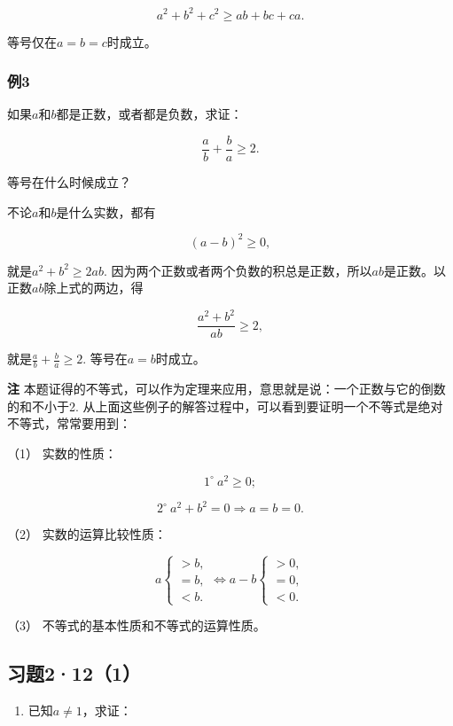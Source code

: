 \[
a^2+b^2+c^2\geqslant ab+bc+ca.
\]

等号仅在\(a=b=c\)时成立。

\subsubsection{例3}

如果\(a\)和\(b\)都是正数，或者都是负数，求证：

\[
\frac{a}{b} + \frac{b}{a} \geqslant 2.
\]

等号在什么时候成立？

 不论\(a\)和\(b\)是什么实数，都有

\[
(a - b)^{2} \geqslant 0,
\]

就是\(a^2 + b^2 \geqslant 2ab.\)
因为两个正数或者两个负数的积总是正数，所以\(ab\)是正数。以正数\(ab\)除上式的两边，得

\[
\frac{a^2+b^2}{ab} \geqslant 2,
\]

就是\(\frac{a}{b} +\frac{b}{a}\geqslant 2.\) 等号在\(a = b\)时成立。

\textbf{注}
本题证得的不等式，可以作为定理来应用，意思就是说：一个正数与它的倒数的和不小于2.
从上面这些例子的解答过程中，可以看到要证明一个不等式是绝对不等式，常常要用到：

（1） 实数的性质：

\[
1^{\circ}\ a^2\geqslant0;
\]

\[
2^{\circ}\ a^2+b^2=0 \Rightarrow a = b = 0.
\]

（2） 实数的运算比较性质：

\[
a \left\{ \begin{array}{ll} > b, \\ = b, \\ < b. \end{array} \right. \Leftrightarrow a - b \left\{ \begin{array}{ll} > 0, \\ = 0, \\ < 0. \end{array} \right.
\]

（3） 不等式的基本性质和不等式的运算性质。

\subsection{习题2·12（1）}

\begin{enumerate}
\item
  已知\(a \neq 1\)，求证：
\end{enumerate}

